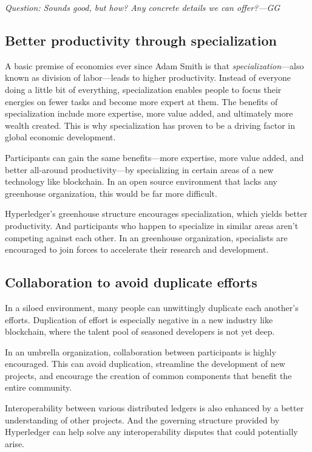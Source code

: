 \emph{Question: Sounds good, but how? Any concrete details we can offer?---GG}

\subsection{Better productivity through specialization}
A basic premise of economics ever since Adam Smith is that \emph{specialization}---also known as division of labor---leads to higher productivity. 
Instead of everyone doing a little bit of everything, specialization enables people to focus their energies on fewer tasks and become more expert at them. 
The benefits of specialization include more expertise, more value added, and ultimately more wealth created. 
This is why specialization has proven to be a driving factor in global economic development. 

Participants can gain the same benefits---more expertise, more value added, and better all-around productivity---by specializing in certain areas of a new technology like blockchain. 
In an open source environment that lacks any greenhouse organization, this would be far more difficult. 

Hyperledger's greenhouse structure encourages specialization, which yields better productivity. 
And participants who happen to specialize in similar areas aren't competing against each other. 
In an greenhouse organization, specialists are encouraged to join forces to accelerate their research and development. 

\subsection{Collaboration to avoid duplicate efforts}
In a siloed environment, many people can unwittingly duplicate each another's efforts. Duplication of effort is especially negative in a new industry like blockchain, where the talent pool of seasoned developers is not yet deep. 

In an umbrella organization, collaboration between participants is highly encouraged. 
This can avoid duplication, streamline the development of new projects, and encourage the creation of common components that benefit the entire community. 

Interoperability between various distributed ledgers is also enhanced by a better understanding of other projects. 
And the governing structure provided by Hyperledger can help solve any interoperability disputes that could potentially arise. 

